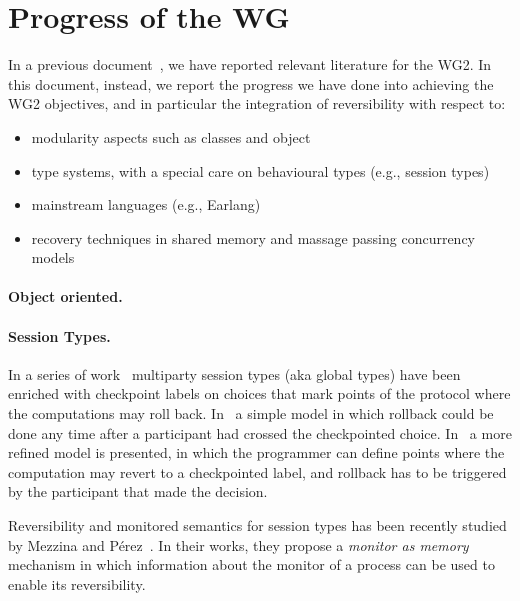 \documentclass[a4paper,oneside]{article}
\begin{document}
\section{Progress of the WG}
In a previous document~\cite{wg2report}, we have reported  relevant literature for the WG2. In this document, instead, we report   the progress we have done into achieving the WG2 objectives, and in particular the integration of reversibility with respect to:

\begin{itemize}
	\item modularity aspects such as classes and object
	\item type systems, with a special care on behavioural types (e.g., session types)
	\item mainstream languages (e.g., Earlang)
	\item recovery techniques in shared memory and massage passing concurrency models
\end{itemize}

\paragraph{Object oriented.}
  

\paragraph{Session Types.}
In a series of work~\cite{DG16,CDG17}
multiparty session types (aka global types) have been enriched with checkpoint labels on choices that mark points of the protocol where the computations may roll back. In~\cite{DG16}  a simple model in which rollback could be done any time after a participant had crossed the checkpointed choice. In~\cite{CDG17}
 a more refined model is presented, in which  the programmer can define  points where  the computation may revert to a checkpointed label, and rollback has to be triggered by the participant that made the decision. 
 
 Reversibility and monitored semantics for session types has been recently studied by Mezzina and  P\'erez~\cite{MezzinaP16a,MezzinaP16b}. In their works, they propose a \textit{monitor as memory} mechanism in which information about the monitor of a process can be used to enable its reversibility.
 
\end{document}
